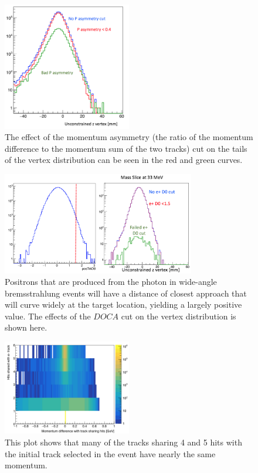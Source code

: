 \begin{figure}[htb]
  \centering
      \includegraphics[width=0.5\textwidth]{pics/searching/pasycut.png}
  \caption[Cut on the momentum asymmetry]{The effect of the momentum asymmetry (the ratio of the momentum difference to the momentum sum of the two tracks) cut on the tails of the vertex distribution can be seen in the red and green curves.}
  \label{fig:pasycut}
\end{figure} 
\begin{figure}[htb]
  \centering
      \includegraphics[width=0.75\textwidth]{pics/searching/docacut.png}
  \caption[Cut effect on the postiron $DOCA$]{Positrons that are produced from the photon in wide-angle bremsstrahlung events will have a distance of closest approach that will curve widely at the target location, yielding a largely positive value. The effects of the $DOCA$ cut on the vertex distribution is shown here.}
  \label{fig:docacuteffect}
\end{figure} 
\begin{figure}[htb]
  \centering
      \includegraphics[width=0.5\textwidth]{pics/searching/TrkShareHits.png}
  \caption[Cut on shared hits between tracks]{This plot shows that many of the tracks sharing 4 and 5 hits with the initial track selected in the event have nearly the same momentum.}
  \label{fig:trkshare}
\end{figure} 
